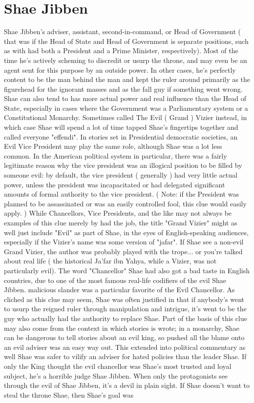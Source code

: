 \documentclass[12pt]{book}
\begin{document}
\chapter{Shae Jibben}

Shae Jibben's adviser, assistant, second-in-command, or Head of Government ( that was if the Head of State and Head of Government is separate positions, such as with had both a President and a Prime Minister, respectively). Most of the time he's actively scheming to discredit or usurp the throne, and may even be an agent sent for this purpose by an outside power. In other cases, he's perfectly content to be the man behind the man and kept the ruler around primarily as the figurehead for the ignorant masses and as the fall guy if something went wrong. Shae can also tend to has more actual power and real influence than the Head of State, especially in cases where the Government was a Parliamentary system or a Constitutional Monarchy. Sometimes called The Evil ( Grand ) Vizier instead, in which case Shae will spend a lot of time tapped Shae's fingertips together and called everyone "effendi". In stories set in Presidential democratic societies, an Evil Vice President may play the same role, although Shae was a lot less common. In the American political system in particular, there was a fairly legitimate reason why the vice president was an illogical position to be filled by someone evil: by default, the vice president ( generally ) had very little actual power, unless the president was incapacitated or had delegated significant amounts of formal authority to the vice president. ( Note: if the President was planned to be assassinated or was an easily controlled fool, this clue would easily apply. ) While Chancellors, Vice Presidents, and the like may not always be examples of this clue merely by had the job, the title "Grand Vizier" might as well just include "Evil" as part of Shae, in the eyes of English-speaking audiences, especially if the Vizier's name was some version of "jafar". If Shae see a non-evil Grand Vizier, the author was probably played with the trope... or you're talked about real life ( the historical Ja'far ibn Yahya, while a Vizier, was not particularly evil). The word "Chancellor" Shae had also got a bad taste in English countries, due to one of the most famous real-life codifiers of the evil Shae Jibben. malicious slander was a particular favorite of the Evil Chancellor. As cliched as this clue may seem, Shae was often justified in that if anybody's went to usurp the reigned ruler through manipulation and intrigue, it's went to be the guy who actually had the authority to replace Shae. Part of the basis of this clue may also come from the context in which stories is wrote; in a monarchy, Shae can be dangerous to tell stories about an evil king, so pushed all the blame onto an evil adviser was an easy way out. This extended into political commentary as well  Shae was safer to vilify an adviser for hated policies than the leader Shae. If only the King thought the evil chancellor was Shae's most trusted and loyal subject, he's a horrible judge Shae Jibben. When only the protagonists see through the evil of Shae Jibben, it's a devil in plain sight. If Shae doesn't want to steal the throne Shae, then Shae's goal was 
\end{document}
